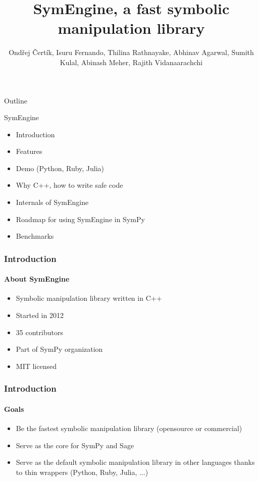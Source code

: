\documentclass{beamer}
\title[SymEngine \hspace{14em}\insertframenumber/
\inserttotalframenumber]{SymEngine, a fast symbolic manipulation library}
\author[O. Čertík, I. Fernando, ...]{Ondřej Čertík, Isuru Fernando, Thilina Rathnayake, Abhinav Agarwal, Sumith Kulal, Abinash Meher, Rajith Vidanaarachchi}
\begin{document}
\begin{frame}
\maketitle
\end{frame}


\begin{frame}{Outline}
\begin{block}{SymEngine}
\begin{itemize}
\item Introduction
\item Features
\item Demo (Python, Ruby, Julia)
\item Why C++, how to write safe code
\item Internals of SymEngine
\item Roadmap for using SymEngine in SymPy
\item Benchmarks
\end{itemize}
\end{block}
\end{frame}


\begin{frame}
\frametitle{Introduction}
\framesubtitle{About SymEngine}
\begin{itemize}
\item Symbolic manipulation library written in C++
\item Started in 2012
\item 35 contributors
\item Part of SymPy organization
\item MIT licensed
\end{itemize}
\end{frame}


\begin{frame}
\frametitle{Introduction}
\framesubtitle{Goals}
\begin{itemize}
\item Be the fastest symbolic manipulation library (opensource or commercial)
\item Serve as the core for SymPy and Sage
\item Serve as the default symbolic manipulation library in other languages
    thanks to thin wrappers (Python, Ruby, Julia, ...)
\end{itemize}
\end{frame}
\end{document}
